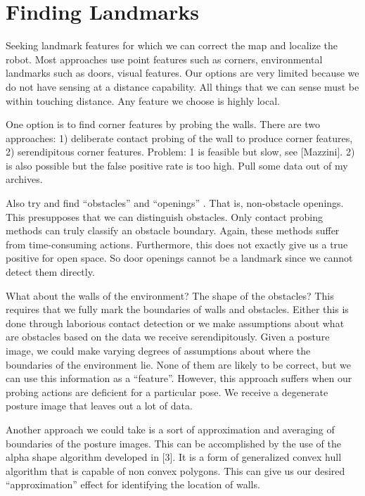 \section{Finding Landmarks}
\label{findinglandmarks}

Seeking landmark features for which we can correct the map and localize the robot. Most approaches use point features such as corners, environmental landmarks such as doors, visual features. Our options are very limited because we do not have sensing at a distance capability. All things that we can sense must be within touching distance. Any feature we choose is highly local.

One option is to find corner features by probing the walls. There are two approaches: 1) deliberate contact probing of the wall to produce corner features, 2) serendipitous corner features. Problem: 1 is feasible but slow, see [Mazzini]. 2) is also possible but the false positive rate is too high. Pull some data out of my archives.

Also try and find “obstacles” and “openings” . That is, non-obstacle openings. This presupposes that we can distinguish obstacles. Only contact probing methods can truly classify an obstacle boundary. Again, these methods suffer from time-consuming actions. Furthermore, this does not exactly give us a true positive for open space. So door openings cannot be a landmark since we cannot detect them directly.

What about the walls of the environment? The shape of the obstacles? This requires that we fully mark the boundaries of walls and obstacles. Either this is done through laborious contact detection or we make assumptions about what are obstacles based on the data we receive serendipitously. Given a posture image, we could make varying degrees of assumptions about where the boundaries of the environment lie. None of them are likely to be correct, but we can use this information as a “feature”. However, this approach suffers when our probing actions are deficient for a particular pose. We receive a degenerate posture image that leaves out a lot of data. 

Another approach we could take is a sort of approximation and averaging of boundaries of the posture images. This can be accomplished by the use of the alpha shape algorithm developed in [3]. It is a form of generalized convex hull algorithm that is capable of non convex polygons. This can give us our desired “approximation” effect for identifying the location of walls.

